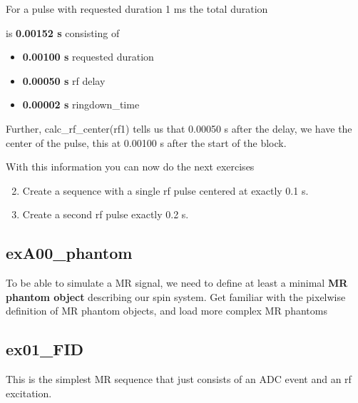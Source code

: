 \documentclass[a4paper,12pt]{extarticle}
\begin{document}
For a pulse with requested duration 1 ms the total duration

is\textbf{ 0.00152 s} consisting of 
\begin{itemize}
    \item \textbf{0.00100 s}  requested duration
    \item \textbf{0.00050 s} rf  delay
    \item \textbf{0.00002 s} ringdown\_time
\end{itemize}
Further, calc\_rf\_center(rf1) tells us that 0.00050 s after the delay, we have the center of the pulse, this at 0.00100 s  after the start of the block.

With this information you can now do the next exercises

\begin{enumerate}
\setcounter{enumi}{1}

\item 	Create a sequence with a single rf pulse centered at exactly 0.1 s. 
\item 	Create a second rf pulse exactly 0.2 s. 

\end{enumerate}

\subsection{exA00\_phantom}
To be able to simulate a MR signal, we need to define at least a minimal \textbf{MR phantom object }describing our spin system. Get familiar with the pixelwise definition of MR phantom objects, and load more complex MR phantoms

\newpage
\subsection{ex01\_FID}
This is  the simplest MR sequence that just consists of an ADC event and an rf excitation.
\end{document}
